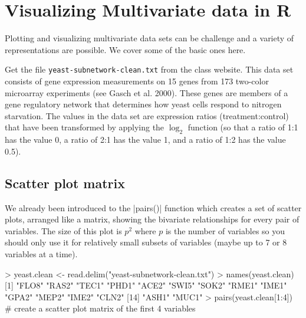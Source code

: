 
\section{Visualizing Multivariate data in R}

Plotting and visualizing multivariate data sets can be challenge and a
variety of representations are possible. We cover some of the basic ones
here. 

Get the file \lstinline!yeast-subnetwork-clean.txt! from the class
website. This data set consists of gene expression measurements
on 15 genes from 173 two-color microarray experiments (see Gasch et al.
2000). These genes are members of a gene regulatory network that determines how yeast cells
respond to nitrogen starvation. The values in the data set are
expression ratios (treatment:control) that have been transformed by
applying the $\log_2$ function (so that a ratio of 1:1 has the value 0,
a ratio of 2:1 has the value 1, and a ratio of 1:2 has the value 0.5).  

\subsection{Scatter plot matrix}

We already been introduced to the |pairs()| function which creates a set of scatter plots, arranged like
a matrix, showing the bivariate relationships for every pair of
variables. The size of this plot is $p^2$ where $p$ is the number of
variables so you should only use it for relatively small subsets of
variables (maybe up to 7 or 8 variables at a time).

\begin{R}
> yeast.clean <- read.delim("yeast-subnetwork-clean.txt")
> names(yeast.clean)
 [1] "FLO8" "RAS2" "TEC1" "PHD1" "ACE2" "SWI5" "SOK2" "RME1" "IME1" "GPA2" "MEP2" "IME2" "CLN2"
[14] "ASH1" "MUC1"
> pairs(yeast.clean[1:4]) # create a scatter plot matrix of the first 4 variables
\end{R}

